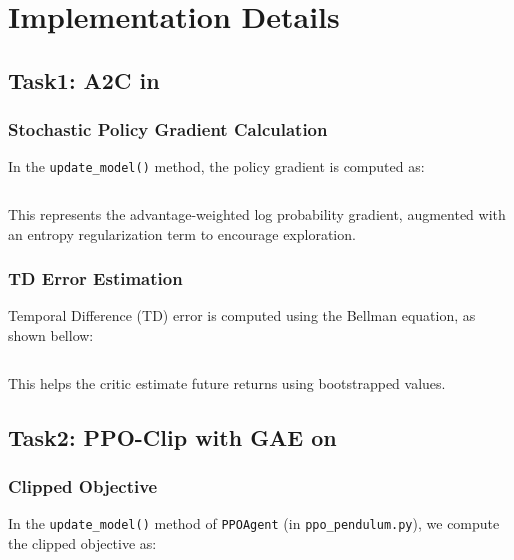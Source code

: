 \section{Implementation Details}
\label{sec:implementation}

\subsection{Task1: A2C in \pendulum}
\label{sec:task1}

\subsubsection{Stochastic Policy Gradient Calculation}

In the \texttt{update\_model()} method, the policy gradient is computed as:

\inputminted[autogobble, firstline=179, lastline=212, highlightlines={202-205}]{python}{../a2c_pendulum.py}

This represents the advantage-weighted log probability gradient, augmented with an entropy regularization term to encourage exploration.

\subsubsection{TD Error Estimation}

Temporal Difference (TD) error is computed using the Bellman equation, as shown bellow:

\inputminted[autogobble, firstline=179, lastline=212, highlightlines={191-192,194}]{python}{../a2c_pendulum.py}

This helps the critic estimate future returns using bootstrapped values.

\subsection{Task2: PPO-Clip with GAE on \pendulum}
\label{sec:task2}

\subsubsection{Clipped Objective}

In the \texttt{update\_model()} method of \texttt{PPOAgent} (in \texttt{ppo\_pendulum.py}), we compute the clipped objective as:

\inputminted[autogobble, firstline=236, lastline=301, highlightlines={271,273-278}]{python}{../ppo_pendulum.py}


